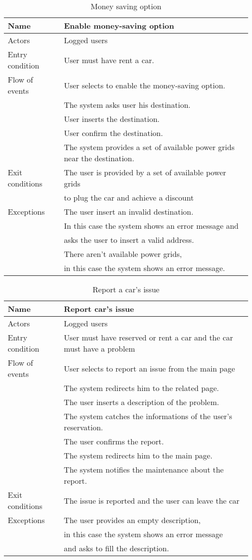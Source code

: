 \documentclass[10pt, a4paper,titlepage]{article}
\begin{document}
\begin{table}[h]
\caption{Money saving option} \label{tab:scenario8}
\begin{tabular}{|l|l|}
\hline
Name & Enable money-saving option \\
\hline
Actors & Logged users \\
\hline
Entry condition & User must have rent a car.\\
\hline
Flow of events & User selects to enable the money-saving option.\\
& The system asks user his destination.\\
& User inserts the destination.\\
& User confirm the destination.\\
& The system provides a set of available power grids near the destination.\\
\hline
Exit conditions & The user is provided by a set of available power grids\\
& to plug the car and achieve a discount\\
\hline
Exceptions & The user insert an invalid destination.\\
& In this case the system shows an error message and \\
& asks the user to insert a valid address.\\
& There aren’t available power grids,\\
& in this case the system shows an error message.\\
\hline
\end{tabular}
\end{table}
\begin{table}[h]
\caption{Report a car's issue} \label{tab:scenario9}
\begin{tabular}{|l|l|}
\hline
Name & Report car’s issue\\
\hline
Actors & Logged users\\ 
\hline
Entry condition & User must have reserved or rent a car and the car must have a problem\\
\hline
Flow of events & User selects to report an issue from the main page\\
& The system redirects him to the related page.\\
& The user inserts a description of the problem.\\
& The system catches the informations of the user’s reservation.\\
& The user confirms the report.\\
& The system redirects him to the main page.\\
& The system notifies the maintenance about the report.\\
\hline
Exit conditions & The issue is reported and the user can leave the car \\
\hline
Exceptions & The user provides an empty description, \\
& in this case the system shows an error message \\
& and asks to fill the description.\\
\hline
\end{tabular}
\end{table}
\end{document}
